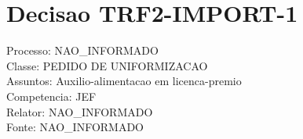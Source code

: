 \documentclass[12pt]{article}
\begin{document}
\section*{Decisao TRF2-IMPORT-1}
Processo: NAO\_INFORMADO\\
Classe: PEDIDO DE UNIFORMIZACAO\\
Assuntos: Auxilio-alimentacao em licenca-premio\\
Competencia: JEF\\
Relator: NAO\_INFORMADO\\
Fonte: NAO\_INFORMADO
\end{document}

